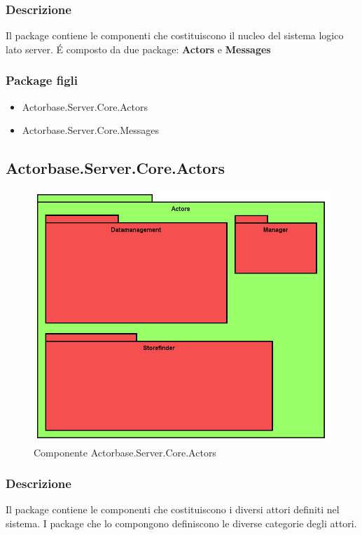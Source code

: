 \documentclass[a4paper]{article}
\begin{document}
			\subsubsection{Descrizione}
				Il package contiene le componenti che costituiscono il nucleo del sistema logico lato server. \'E composto da due package: \textbf{Actors} e \textbf{Messages}
			\subsubsection{Package figli}
			\begin{itemize}
				\item Actorbase.Server.Core.Actors
				\item Actorbase.Server.Core.Messages
			\end{itemize}
			
		\subsection{Actorbase.Server.Core.Actors}
			\begin{figure} [H]
			\centering
			\includegraphics[scale=0.50]{Server/Package/ActorsLevel.png}
			\caption{Componente Actorbase.Server.Core.Actors}
			\end{figure}
			\subsubsection{Descrizione}
				Il package contiene le componenti che costituiscono i diversi attori definiti nel sistema. I package che lo compongono definiscono le diverse categorie degli attori.
\end{document}
